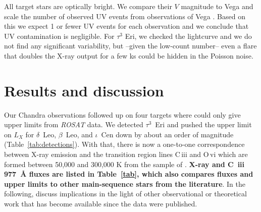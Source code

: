 \documentclass[linenumbers]{aastex631}
\begin{document}
All target stars are optically bright. We compare their $V$ magnitude
to Vega and scale the number of observed UV events from observations
of Vega \citep{2006ApJ...636..426P}. Based on this we expect 1 or fewer UV
events for each observation and we conclude that UV contamination is
negligible. For $\tau^3$ Eri, we checked the lightcurve and we do not find any significant variability, but --given the low-count number-- even a flare that doubles the X-ray output for a few ks could be hidden in the Poisson noise.


\section{Results and discussion}  \label{sec:discussion}
Our Chandra observations followed up on four targets where \cite{2002ApJ...579..800S} could only give upper limits from \emph{ROSAT} data. We detected $\tau^3$~Eri and pushed the upper limit on $L_X$ for $\delta$~Leo, $\beta$~Leo, and $\iota$~Cen down by about an order of magnitude (Table~\ref{tab:detections}). With that, there is now a one-to-one correspondence between X-ray emission and the transition region lines C\,{\sc iii} and O\,{\sc vi} which are formed between 50,000 and 300,000 K from the sample of \cite{2002ApJ...579..800S}. 
\textbf{X-ray and C~{\sc iii} 977~\AA{} fluxes are listed in Table~\ref{tab}, which also compares fluxes and upper limits to other main-sequence stars from the literature}.
In the following, discuss implications in the light of other observational or theoretical work that has become available since the \cite{2002ApJ...579..800S} data were published.
\end{document}
